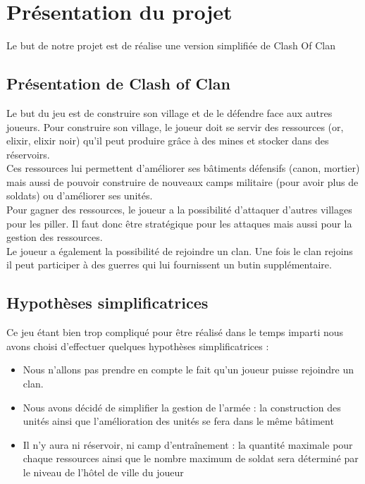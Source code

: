\chapter{Présentation du projet}
	Le but de notre projet est de réalise une version simplifiée de Clash Of Clan

    \section{Présentation de Clash of Clan}
		Le but du jeu est de construire son village et de le défendre face aux autres joueurs. Pour construire son village, le joueur doit se servir des ressources (or, elixir, elixir noir) qu'il peut produire grâce à des mines et stocker dans des réservoirs. \\
		Ces ressources lui permettent d'améliorer ses bâtiments défensifs (canon, mortier) mais aussi de pouvoir construire de nouveaux camps militaire (pour avoir plus de soldats) ou d'améliorer ses unités. \\
		Pour gagner des ressources, le joueur a la possibilité d'attaquer d'autres villages pour les piller. Il faut donc être stratégique pour les attaques mais aussi pour la gestion des ressources. \\
		Le joueur a également la possibilité de rejoindre un clan. Une fois le clan rejoins il peut participer à des guerres qui lui fournissent un butin supplémentaire.      
        
    \section{Hypothèses simplificatrices}
		Ce jeu étant bien trop compliqué pour être réalisé dans le temps imparti nous avons choisi d'effectuer quelques hypothèses simplificatrices : 
\begin{itemize}
\item Nous n'allons pas prendre en compte le fait qu'un joueur puisse rejoindre un clan. 
\item Nous avons décidé de simplifier la gestion de l'armée : la construction des unités ainsi que l'amélioration des unités se fera dans le même bâtiment
\item Il n'y aura ni réservoir, ni camp d’entraînement : la quantité maximale pour chaque ressources ainsi que le nombre maximum de soldat sera déterminé par le niveau de l'hôtel de ville du joueur
\end{itemize}